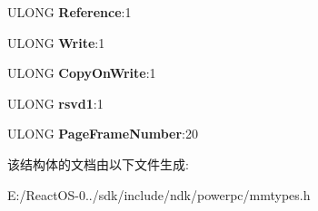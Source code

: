 \begin{DoxyCompactItemize}
\mbox{\label{struct___h_a_r_d_w_a_r_e___p_t_e___p_p_c_ac8667414108ff346445327ef0e9cf1cb}} 
U\+L\+O\+NG {\bfseries Reference}\+:1
\item 
\mbox{\label{struct___h_a_r_d_w_a_r_e___p_t_e___p_p_c_a3abcd7a56e16935630c9c1f7253dd2e9}} 
U\+L\+O\+NG {\bfseries Write}\+:1
\item 
\mbox{\label{struct___h_a_r_d_w_a_r_e___p_t_e___p_p_c_af0aca9975430d6349178deb21b58cce4}} 
U\+L\+O\+NG {\bfseries Copy\+On\+Write}\+:1
\item 
\mbox{\label{struct___h_a_r_d_w_a_r_e___p_t_e___p_p_c_a70fc51ec99565519785cceb2b77527ac}} 
U\+L\+O\+NG {\bfseries rsvd1}\+:1
\item 
\mbox{\label{struct___h_a_r_d_w_a_r_e___p_t_e___p_p_c_aec3d70f3f337df6f19e65ec7723da3b8}} 
U\+L\+O\+NG {\bfseries Page\+Frame\+Number}\+:20
\end{DoxyCompactItemize}


该结构体的文档由以下文件生成\+:\begin{DoxyCompactItemize}
\item 
E\+:/\+React\+O\+S-\/0../sdk/include/ndk/powerpc/mmtypes.\+h\end{DoxyCompactItemize}
